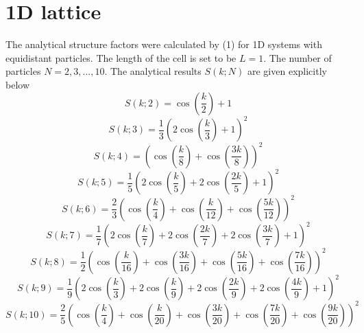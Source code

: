 \documentclass[journal=jacsat,manuscript=article]{achemso}
\begin{document}
	\section{1D lattice}
	The analytical structure factors were calculated by (1) for 1D systems with equidistant particles. The length of the cell is set to be $L=1$. The number of particles $N = 2,3,...,10$. The analytical results $S(k;N)$ are given explicitly below
	\begin{equation*}
		S(k;2)=\cos \left(\frac{k}{2}\right)+1
	\end{equation*}
	\begin{equation*}
		S(k;3)=\frac{1}{3} \left(2 \cos \left(\frac{k}{3}\right)+1\right)^2
	\end{equation*}
	\begin{equation*}
		S(k;4)=\left(\cos \left(\frac{k}{8}\right)+\cos \left(\frac{3 k}{8}\right)\right)^2
	\end{equation*}
	\begin{equation*}
		S(k;5)=\frac{1}{5} \left(2 \cos \left(\frac{k}{5}\right)+2 \cos \left(\frac{2 k}{5}\right)+1\right)^2
	\end{equation*}
	\begin{equation*}
		S(k;6)=\frac{2}{3} \left(\cos \left(\frac{k}{4}\right)+\cos \left(\frac{k}{12}\right)+\cos \left(\frac{5 k}{12}\right)\right)^2
	\end{equation*}
	\begin{equation*}
		S(k;7)=\frac{1}{7} \left(2 \cos \left(\frac{k}{7}\right)+2 \cos \left(\frac{2 k}{7}\right)+2 \cos \left(\frac{3 k}{7}\right)+1\right)^2
	\end{equation*}
	\begin{equation*}
		S(k;8)=\frac{1}{2} \left(\cos \left(\frac{k}{16}\right)+\cos \left(\frac{3 k}{16}\right)+\cos \left(\frac{5 k}{16}\right)+\cos \left(\frac{7 k}{16}\right)\right)^2
	\end{equation*}
	\begin{equation*}
		S(k;9)=\frac{1}{9} \left(2 \cos \left(\frac{k}{3}\right)+2 \cos \left(\frac{k}{9}\right)+2 \cos \left(\frac{2 k}{9}\right)+2 \cos \left(\frac{4 k}{9}\right)+1\right)^2
	\end{equation*}
	\begin{equation*}
		S(k;10)=\frac{2}{5} \left(\cos \left(\frac{k}{4}\right)+\cos \left(\frac{k}{20}\right)+\cos \left(\frac{3 k}{20}\right)+\cos \left(\frac{7 k}{20}\right)+\cos \left(\frac{9 k}{20}\right)\right)^2
	\end{equation*}
	
\end{document}
